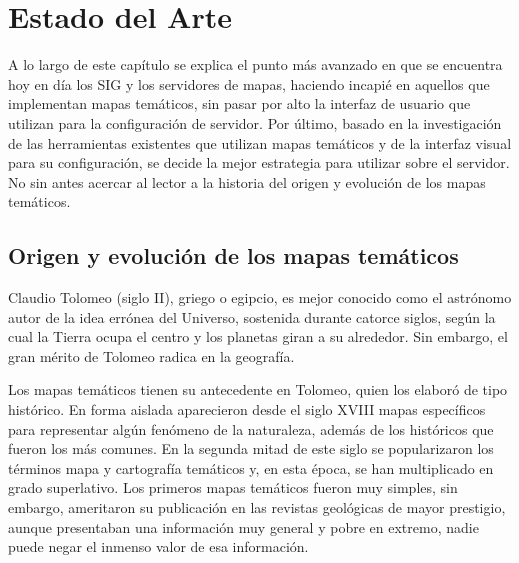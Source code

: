 
\chapter{Estado del Arte}

A lo largo de este cap\'itulo se explica el punto m\'as avanzado en que se encuentra hoy en d\'ia los SIG y los servidores de mapas, haciendo incapi\'e en aquellos que implementan mapas tem\'aticos, sin pasar por alto la interfaz de usuario que utilizan para la configuraci\'on de servidor. Por \'ultimo, basado en la investigaci\'on de las herramientas existentes que utilizan mapas tem\'aticos y de la interfaz visual para su configuraci\'on, se decide la mejor estrategia para utilizar sobre el servidor. No sin antes acercar al lector a la historia del origen y evoluci\'on de los mapas tem\'aticos.


\section{Origen y evoluci\'on de los mapas tem\'aticos}

Claudio Tolomeo (siglo II), griego o egipcio, es mejor conocido como el astr\'onomo autor de la idea err\'onea del Universo, sostenida durante catorce siglos, seg\'un la cual la Tierra ocupa el centro y los planetas giran a su alrededor. Sin embargo, el gran m\'erito de Tolomeo radica en la geograf\'ia.

Los mapas tem\'aticos tienen su antecedente en Tolomeo, quien los elabor\'o de tipo hist\'orico. En forma aislada aparecieron desde el siglo XVIII mapas espec\'ificos para representar alg\'un fen\'omeno de la naturaleza, adem\'as de los hist\'oricos que fueron los m\'as comunes. En la segunda mitad de este siglo se popularizaron los t\'erminos mapa y cartograf\'ia tem\'aticos y, en esta \'epoca, se han multiplicado en grado superlativo. Los primeros mapas tem\'aticos fueron muy simples, sin embargo, ameritaron su publicaci\'on en las revistas geol\'ogicas de mayor prestigio, aunque presentaban una informaci\'on muy general y pobre en extremo, nadie puede negar el inmenso valor de esa informaci\'on.\cite{histTematico}

